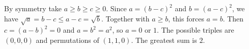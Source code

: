 By symmetry take $a\ge b\ge c\ge0$. Since $a=(b-c)^2$ and $b=(a-c)^2$, we have $\sqrt a=b-c\le a-c=\sqrt b$. Together with $a\ge b$, this forces $a=b$. Then $c=(a-b)^2=0$ and $a=b^2=a^2$, so $a=0$ or $1$. The possible triples are $(0,0,0)$ and permutations of $(1,1,0)$. The greatest sum is $\boxed2$.

